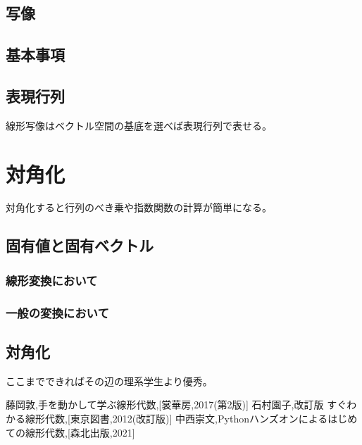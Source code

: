 \documentclass[10pt]{jsarticle}
\numberwithin{equation}{section}%
\begin{document}
\subsection{写像}
\subsection{基本事項}
\subsection{表現行列}
線形写像はベクトル空間の基底を選べば表現行列で表せる。
\section{対角化}
対角化すると行列のべき乗や指数関数の計算が簡単になる。
\subsection{固有値と固有ベクトル}
\subsubsection{線形変換において}
\subsubsection{一般の変換において}
\subsection{対角化}
ここまでできればその辺の理系学生より優秀。
\begin{thebibliography}{99}
   藤岡敦,手を動かして学ぶ線形代数,[裳華房,2017(第2版)]
   石村園子,改訂版 すぐわかる線形代数,[東京図書,2012(改訂版)]
   中西崇文,Pythonハンズオンによるはじめての線形代数,[森北出版,2021]
\end{thebibliography}
\end{document}
